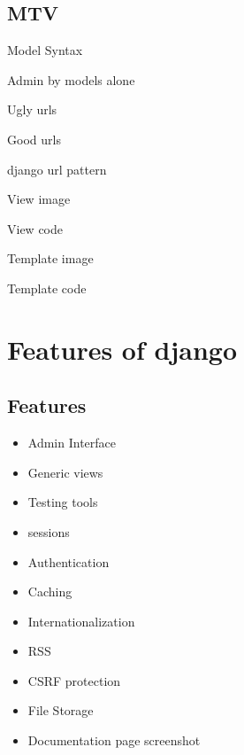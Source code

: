 \documentclass{beamer}
\begin{document}
	\subsection{MTV}
		\begin{frame}
			{Model Syntax}
		\end{frame}
		\begin{frame}
			{Admin by models alone}
		\end{frame}
		\begin{frame}
			{Ugly urls}
		\end{frame}
		\begin{frame}
			{Good urls}
		\end{frame}
		\begin{frame}
			{django url pattern}
		\end{frame}
		\begin{frame}
			{View image}
		\end{frame}
		\begin{frame}
			{View code}
		\end{frame}
		\begin{frame}
			{Template image}
		\end{frame}
		\begin{frame}
			{Template code}
		\end{frame}



\section{Features of django}
	\subsection{Features}
		\begin{frame}
		\begin{itemize}                                    \item
			Admin Interface                         \pause \item
			Generic views                           \pause \item
			Testing tools                           \pause \item
			sessions                                \pause \item
			Authentication                          \pause \item
			Caching                                 \pause \item
			Internationalization                    \pause \item
			RSS                                     \pause \item
			CSRF protection                         \pause \item
			File Storage                            \pause \item
			Documentation page screenshot
		\end{itemize}
		\end{frame}
\end{document}

